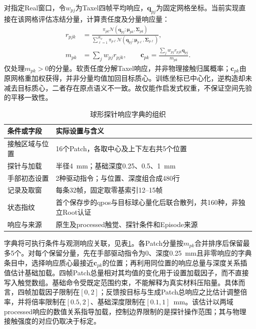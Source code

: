 对指定Real窗口，令$w_{pj}$为Taxel四帧平均响应，$\boldsymbol q_{pj}$为固定网格坐标。当前实现直接在该网格评估冻结分量，计算责任度及分量响应量：
\begin{equation}
 \begin{aligned}
 r_{pjk}&=\frac{\pi_{pk}\mathcal N(\boldsymbol q_{pj};\boldsymbol\mu_{pk},\boldsymbol\Sigma_{pk})}
 {\sum_{\ell=1}^{K_p}\pi_{p\ell}\mathcal N(\boldsymbol q_{pj};\boldsymbol\mu_{p\ell},\boldsymbol\Sigma_{p\ell})},\\
 m_{pk}&=\sum_j w_{pj}r_{pjk},\qquad
 \boldsymbol c_{pk}=\frac{\sum_j w_{pj}r_{pjk}\boldsymbol q_{pj}}{m_{pk}}.
 \end{aligned}
 \label{eq:ch05_gmm_responsibility}
\end{equation}
仅处理$m_{pk}>0$的分量。软责任度分解Taxel响应，并非物理接触归属概率；$\boldsymbol c_{pk}$由原网格重加权获得，并非分量均值加回目标质心。训练坐标已中心化，逆构造却未减去目标质心，二者存在原点语义不一致。故仅能作启发式权重，不保证空间先验的平移一致性。

\begin{table}[htbp]
 \centering\small
 \caption{球形探针响应字典的组织}
 \label{tab:ch05_probe_dictionary}
 \begin{tabular}{p{}p{}}
 \hline
 条件或字段 & 实际设置与含义\\
 \hline
 接触区域与位置 & 16个Patch，各取中心及上下左右共5个位置\\
 探针与加载 & 半径4~mm；基础深度0.25、0.5、1~mm\\
 手部初态设置 & 2种驱动指令；与位置、深度组合成480行\\
 记录及取窗 & 每条32帧，固定取零基索引12--15帧\\
 状态指纹 & 首个保存步的qpos与目标球心量化后联合散列，共160种，非独立Root认证\\
 响应与来源 & 原生及processed触觉、探针条件和Episode来源\\
 \hline
 \end{tabular}
\end{table}

字典将可执行条件与观测响应关联，见表\ref{tab:ch05_probe_dictionary}。各Patch分量按$m_{pk}$合并排序后保留最多5个。对每个保留分量，先在手部驱动指令为0、深度0.25~mm且非零响应的字典条目中，选择响应质心最接近$\boldsymbol c_{pk}$的位置；再利用同位置的响应总量与深度关系插值估计基础加载。四帧Patch总量相对其均值的变化用于设置加载因子，而不直接写入触觉数组。基础命令受既定范围约束，不能解释为真实材料压陷量。具体而言，四帧加载因子限制在$[0,2]$；反馈按目标与生成Patch总响应之比估计调整倍率，并将倍率限制在$[0.5,2]$、基础深度限制在$[0.1,1]$~mm。该估计以两域processed响应的数值关系指导加载，控制边界限制的是探针操作范围；其与物理接触强度的对应仍取决于标定。

